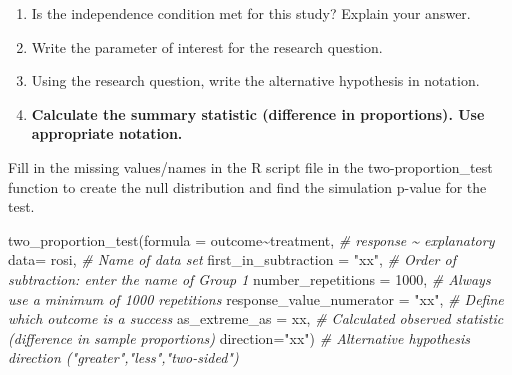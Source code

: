 \documentclass[
]{report}
\newenvironment{Shaded}{\begin{snugshade}}{\end{snugshade}}
\newcommand{\AttributeTok}[1]{\textcolor[rgb]{0.77,0.63,0.00}{#1}}
\newcommand{\CommentTok}[1]{\textcolor[rgb]{0.56,0.35,0.01}{\textit{#1}}}
\newcommand{\DecValTok}[1]{\textcolor[rgb]{0.00,0.00,0.81}{#1}}
\newcommand{\FunctionTok}[1]{\textcolor[rgb]{0.00,0.00,0.00}{#1}}
\newcommand{\NormalTok}[1]{#1}
\newcommand{\SpecialCharTok}[1]{\textcolor[rgb]{0.00,0.00,0.00}{#1}}
\newcommand{\StringTok}[1]{\textcolor[rgb]{0.31,0.60,0.02}{#1}}
\begin{document}
\begin{enumerate}
\def\labelenumi{\arabic{enumi}.}
\setcounter{enumi}{2}
\item
  Is the independence condition met for this study? Explain your answer.
  \vspace{0.6in}
\item
  Write the parameter of interest for the research question.
  \vspace{0.6in}
\item
  Using the research question, write the alternative hypothesis in notation.
  \vspace{0.3in}
\item
  \textbf{Calculate the summary statistic (difference in proportions). Use appropriate notation.}
  \vspace{0.3in}
\end{enumerate}

Fill in the missing values/names in the R script file in the two-proportion\_test function to create the null distribution and find the simulation p-value for the test.

\begin{Shaded}
\begin{Highlighting}[]
\FunctionTok{two\_proportion\_test}\NormalTok{(}\AttributeTok{formula =}\NormalTok{ outcome}\SpecialCharTok{\textasciitilde{}}\NormalTok{treatment, }\CommentTok{\# response \textasciitilde{} explanatory}
         \AttributeTok{data=}\NormalTok{ rosi, }\CommentTok{\# Name of data set}
         \AttributeTok{first\_in\_subtraction =} \StringTok{"xx"}\NormalTok{, }\CommentTok{\# Order of subtraction: enter the name of Group 1}
         \AttributeTok{number\_repetitions =} \DecValTok{1000}\NormalTok{, }\CommentTok{\# Always use a minimum of 1000 repetitions}
         \AttributeTok{response\_value\_numerator =} \StringTok{"xx"}\NormalTok{, }\CommentTok{\# Define which outcome is a success }
         \AttributeTok{as\_extreme\_as =}\NormalTok{ xx, }\CommentTok{\# Calculated observed statistic (difference in sample proportions)}
         \AttributeTok{direction=}\StringTok{"xx"}\NormalTok{) }\CommentTok{\# Alternative hypothesis direction ("greater","less","two{-}sided")}
\end{Highlighting}
\end{Shaded}
\end{document}
